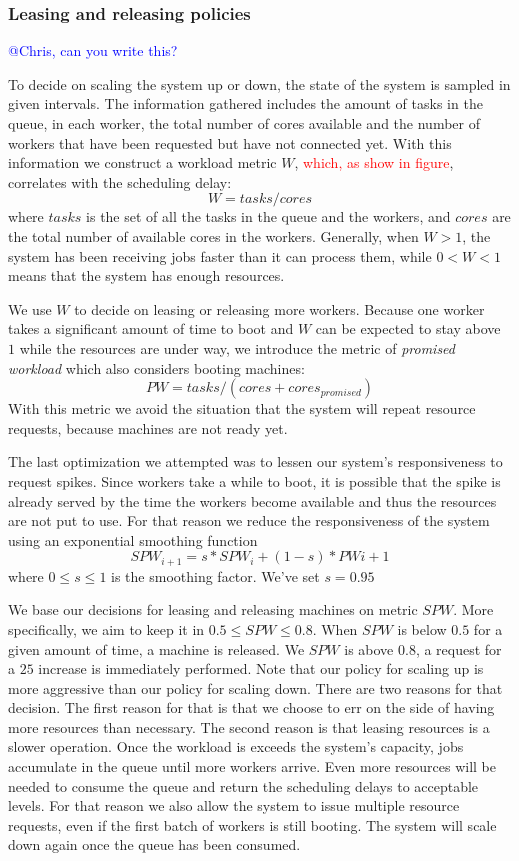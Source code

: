 \documentclass{stylesheet}
\begin{document}
\subsubsection*{Leasing and releasing policies}
\textcolor{blue}{@Chris, can you write this?}

To decide on scaling the system up or down, the state of the system is sampled in given intervals. The information gathered includes the amount of tasks in the queue, in each worker, the total number of cores available and the number of workers that have been requested but have not connected yet. With this information we construct a workload metric $W$, \textcolor{red}{which, as show in figure}, correlates with the scheduling delay: $$W = tasks/cores$$ where $tasks$ is the set of all the tasks in the queue and the workers, and $cores$ are the total number of available cores in the workers. Generally, when $W > 1$, the system has been receiving jobs faster than it can process them, while $0 < W < 1$ means that the system has enough resources.

We use $W$ to decide on leasing or releasing more workers. Because one worker takes a significant amount of time to boot and $W$ can be expected to stay above $1$ while the resources are under way, we introduce the metric of \textit{promised workload} which also considers booting machines: 
$$PW = tasks/(cores + cores_{promised})$$
With this metric we avoid the situation that the system will repeat resource requests, because machines are not ready yet.

The last optimization we attempted was to lessen our system's responsiveness to request spikes. Since workers take a while to boot, it is possible that the spike is already served by the time the workers become available and thus the resources are not put to use. For that reason we reduce the responsiveness of the system using an exponential smoothing function
$$SPW_{i+1} = s*SPW_{i} + (1-s)*PW{i+1}$$ where $0 \leq s \leq 1$ is the smoothing factor. We've set $s=0.95$

We base our decisions for leasing and releasing machines on metric $SPW$. More specifically, we aim to keep it in $0.5 \leq SPW \leq 0.8$. When $SPW$ is below $0.5$ for a given amount of time, a machine is released. We $SPW$ is above $0.8$, a request for a $25$ increase is immediately performed. Note that our policy for scaling up is more aggressive than our policy for scaling down. There are two reasons for that decision. The first reason for that is that we choose to err on the side of having more resources than necessary. The second reason is that leasing resources is a slower operation. Once the workload is exceeds the system's capacity, jobs accumulate in the queue until more workers arrive. Even more resources will be needed to consume the queue and return the scheduling delays to acceptable levels. For that reason we also allow the system to issue multiple resource requests, even if the first batch of workers is still booting. The system will scale down again once the queue has been consumed.
\end{document}
